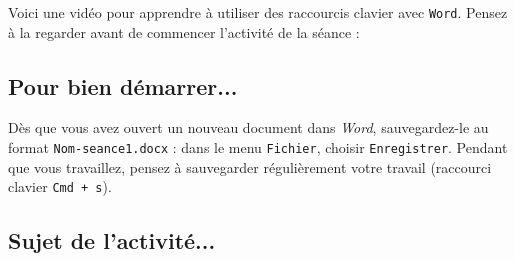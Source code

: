 \vspace{10pt}

Voici une vidéo pour apprendre à utiliser des raccourcis clavier avec \texttt{Word}. Pensez à la regarder avant de commencer l'activité de la séance :

\begin{center}
\end{center}

\vspace{12pt}


\subsection{Pour bien démarrer...}

Dès que vous avez ouvert un nouveau document dans \emph{Word}, sauvegardez-le au format \texttt{Nom-seance1.docx} : dans le menu \texttt{Fichier}, choisir \texttt{Enregistrer}. Pendant que vous travaillez, pensez à sauvegarder régulièrement votre travail (raccourci clavier \texttt{Cmd + s}).   


\subsection{Sujet de l'activité...}

\vspace{10pt}

